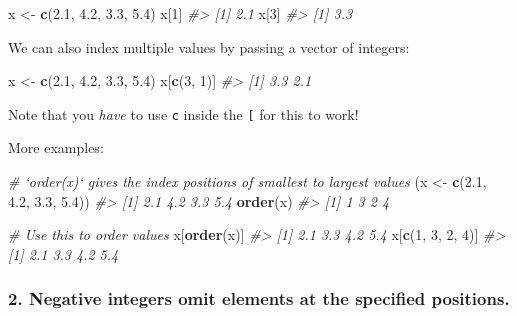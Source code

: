 \documentclass[
]{book}
\newenvironment{Shaded}{\begin{snugshade}}{\end{snugshade}}
\newcommand{\CommentTok}[1]{\textcolor[rgb]{0.56,0.35,0.01}{\textit{#1}}}
\newcommand{\DecValTok}[1]{\textcolor[rgb]{0.00,0.00,0.81}{#1}}
\newcommand{\FloatTok}[1]{\textcolor[rgb]{0.00,0.00,0.81}{#1}}
\newcommand{\KeywordTok}[1]{\textcolor[rgb]{0.13,0.29,0.53}{\textbf{#1}}}
\newcommand{\NormalTok}[1]{#1}
\newcommand{\StringTok}[1]{\textcolor[rgb]{0.31,0.60,0.02}{#1}}
\begin{document}
\begin{Shaded}
\begin{Highlighting}[]
\NormalTok{x <-}\StringTok{ }\KeywordTok{c}\NormalTok{(}\FloatTok{2.1}\NormalTok{, }\FloatTok{4.2}\NormalTok{, }\FloatTok{3.3}\NormalTok{, }\FloatTok{5.4}\NormalTok{)}
\NormalTok{x[}\DecValTok{1}\NormalTok{]}
\CommentTok{#> [1] 2.1}
\NormalTok{x[}\DecValTok{3}\NormalTok{]}
\CommentTok{#> [1] 3.3}
\end{Highlighting}
\end{Shaded}

We can also index multiple values by passing a vector of integers:

\begin{Shaded}
\begin{Highlighting}[]
\NormalTok{x <-}\StringTok{ }\KeywordTok{c}\NormalTok{(}\FloatTok{2.1}\NormalTok{, }\FloatTok{4.2}\NormalTok{, }\FloatTok{3.3}\NormalTok{, }\FloatTok{5.4}\NormalTok{)}
\NormalTok{x[}\KeywordTok{c}\NormalTok{(}\DecValTok{3}\NormalTok{, }\DecValTok{1}\NormalTok{)]}
\CommentTok{#> [1] 3.3 2.1}
\end{Highlighting}
\end{Shaded}

Note that you \emph{have} to use \texttt{c} inside the \texttt{{[}} for this to work!

More examples:

\begin{Shaded}
\begin{Highlighting}[]
\CommentTok{# `order(x)` gives the index positions of smallest to largest values}
\NormalTok{(x <-}\StringTok{ }\KeywordTok{c}\NormalTok{(}\FloatTok{2.1}\NormalTok{, }\FloatTok{4.2}\NormalTok{, }\FloatTok{3.3}\NormalTok{, }\FloatTok{5.4}\NormalTok{))}
\CommentTok{#> [1] 2.1 4.2 3.3 5.4}
\KeywordTok{order}\NormalTok{(x)}
\CommentTok{#> [1] 1 3 2 4}

\CommentTok{# Use this to order values}
\NormalTok{x[}\KeywordTok{order}\NormalTok{(x)]}
\CommentTok{#> [1] 2.1 3.3 4.2 5.4}
\NormalTok{x[}\KeywordTok{c}\NormalTok{(}\DecValTok{1}\NormalTok{, }\DecValTok{3}\NormalTok{, }\DecValTok{2}\NormalTok{, }\DecValTok{4}\NormalTok{)]}
\CommentTok{#> [1] 2.1 3.3 4.2 5.4}
\end{Highlighting}
\end{Shaded}

\hypertarget{negative-integers-omit-elements-at-the-specified-positions.}{%
\subsubsection*{\texorpdfstring{2. \textbf{Negative integers} omit elements at the specified positions.}{2. Negative integers omit elements at the specified positions.}}\label{negative-integers-omit-elements-at-the-specified-positions.}}
\end{document}
